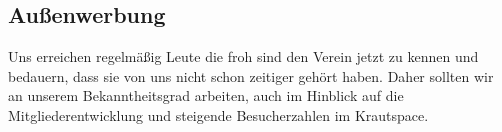 \documentclass[ngerman]{scrartcl}
\begin{document}
\subsection{Außenwerbung}
Uns erreichen regelmäßig Leute die froh sind den Verein jetzt zu kennen und bedauern, dass sie von uns nicht schon zeitiger gehört haben.
Daher sollten wir an unserem Bekanntheitsgrad arbeiten, auch im Hinblick auf die Mitgliederentwicklung und steigende Besucherzahlen im Krautspace.
\end{document}
